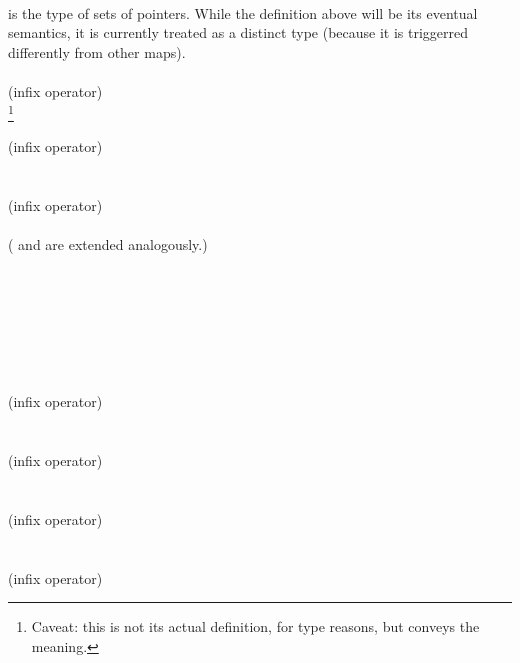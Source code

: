 \documentclass[preprint,nocopyrightspace]{sigplanconf}
\begin{document}
{{ \\
\vcc{\objset} is the type of sets of pointers. While the definition
above will be its eventual semantics, it is currently treated 
as a distinct type (because it is triggerred differently from other
maps). 
\\\\
 (infix operator)\\
\footnote{
Caveat: this is not its actual definition, for type reasons, but
conveys the meaning.}
\\\\
 (infix operator)\\
\\\\
 (infix operator)\\
\\
(\vcc{+=} and \vcc{-=} are extended analogously.)
\\\\
\\
\\\\
\\
\\\\
 (infix operator)\\
\\\\
 (infix operator)\\
\\\\
 (infix operator)\\
\\\\
 (infix operator)

}}
\end{document}
